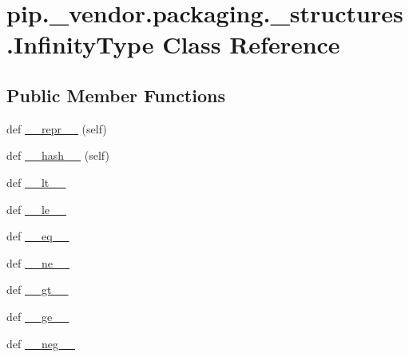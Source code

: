 \hypertarget{classpip_1_1__vendor_1_1packaging_1_1__structures_1_1InfinityType}{}\section{pip.\+\_\+vendor.\+packaging.\+\_\+structures.\+Infinity\+Type Class Reference}
\label{classpip_1_1__vendor_1_1packaging_1_1__structures_1_1InfinityType}
\subsection*{Public Member Functions}
\begin{DoxyCompactItemize}
\item 
def \hyperlink{classpip_1_1__vendor_1_1packaging_1_1__structures_1_1InfinityType_aaa339bacaf33350718bfbcf9f291fce3}{\+\_\+\+\_\+repr\+\_\+\+\_\+} (self)
\item 
def \hyperlink{classpip_1_1__vendor_1_1packaging_1_1__structures_1_1InfinityType_a019d832d3ca8c08a8948410c5c8645c1}{\+\_\+\+\_\+hash\+\_\+\+\_\+} (self)
\item 
def \hyperlink{classpip_1_1__vendor_1_1packaging_1_1__structures_1_1InfinityType_a7f977f2742023ce2de5f70e8b363e68b}{\+\_\+\+\_\+lt\+\_\+\+\_\+}
\item 
def \hyperlink{classpip_1_1__vendor_1_1packaging_1_1__structures_1_1InfinityType_ac2afe9c379e36df92a473c13b1bde140}{\+\_\+\+\_\+le\+\_\+\+\_\+}
\item 
def \hyperlink{classpip_1_1__vendor_1_1packaging_1_1__structures_1_1InfinityType_ad02f9f3b05b95ef464c0da65846843a0}{\+\_\+\+\_\+eq\+\_\+\+\_\+}
\item 
def \hyperlink{classpip_1_1__vendor_1_1packaging_1_1__structures_1_1InfinityType_a53a60c532ab6bb3c9ae8626b65b3c1db}{\+\_\+\+\_\+ne\+\_\+\+\_\+}
\item 
def \hyperlink{classpip_1_1__vendor_1_1packaging_1_1__structures_1_1InfinityType_a9f192863a765602ccd7119ec38cb3107}{\+\_\+\+\_\+gt\+\_\+\+\_\+}
\item 
def \hyperlink{classpip_1_1__vendor_1_1packaging_1_1__structures_1_1InfinityType_a85eefaa1125fcf494db0c4f72bbbd4ca}{\+\_\+\+\_\+ge\+\_\+\+\_\+}
\item 
def \hyperlink{classpip_1_1__vendor_1_1packaging_1_1__structures_1_1InfinityType_a978433ab4906c49c11f87c98ffc261da}{\+\_\+\+\_\+neg\+\_\+\+\_\+}
\end{DoxyCompactItemize}


